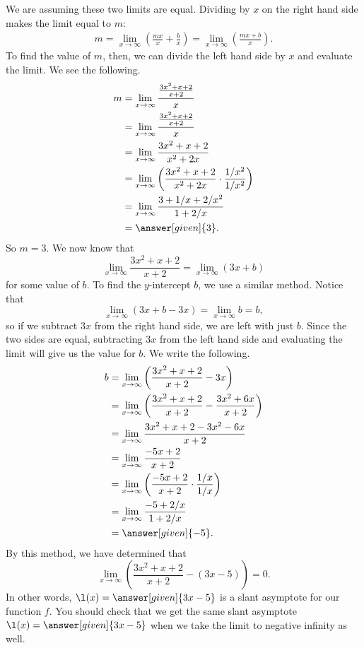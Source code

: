 \documentclass{ximera}
\begin{document}
\begin{example}
\begin{explanation}
    We are assuming these two limits are equal.  Dividing by $x$ on the right hand side makes the limit equal to $m$:
    \begin{align*}
    m = \lim_{x \to \infty} \left(\frac{mx}{x} + \frac{b}{x}\right) = \lim_{x \to \infty} \left(\frac{mx+b}{x}\right).
    \end{align*}
    To find the value of $m$, then, we can divide the left hand side by $x$ and evaluate the limit.   We see the following. 
    \begin{align*}
      m &=\lim_{x\to\infty}\frac{\frac{3x^2+x+2}{x+2}}{x}\\
      &= \lim_{x\to\infty}\frac{\frac{3x^2+x+2}{x+2}}{x}\\
      &= \lim_{x\to\infty}\frac{3x^2+x+2}{x^2+2x}\\
      &= \lim_{x\to\infty}\left(\frac{3x^2+x+2}{x^2+2x}\cdot\frac{1/x^2}{1/x^2}\right)\\
      &= \lim_{x\to\infty}\frac{3+1/x+2/x^2}{1+2/x}\\
      &= \answer[given]{3}.
    \end{align*}
    So $m=3$.  We now know that
    \[
    \lim_{x \to \infty}\frac{3x^2 +x+2}{x+2} = \lim_{x \to \infty} (3x + b)
    \]
    for some value of $b$.  To find the $y$-intercept $b$, we use a similar method.  Notice that
    \[
    \lim_{x \to \infty}( 3x + b - 3x )= \lim_{x \to \infty} b = b,
    \]
    so if we subtract $3x$ from the right hand side, we are left with just $b$.  Since the two sides are equal, subtracting $3x$ from the left hand side and evaluating the limit will give us the value for $b$.  We write the following.
    \begin{align*}
      b &=\lim_{x\to\infty} \left(\frac{3x^2+x+2}{x+2} - 3x\right)\\
      &=\lim_{x\to\infty} \left( \frac{3x^2+x+2}{x+2} - \frac{3x^2 + 6x}{x+2}\right) \\
      &=\lim_{x\to\infty} \frac{3x^2+x+2-3x^2-6x}{x+2}\\
      &=\lim_{x\to\infty}  \frac{-5x+2}{x+2}\\
      &=\lim_{x\to\infty} \left(\frac{-5x+2}{x+2}\cdot\frac{1/x}{1/x}\right)\\
      &=\lim_{x\to\infty} \frac{-5+2/x}{1+2/x}\\
      &= \answer[given]{-5}.
    \end{align*}
    By this method, we have determined that 
    \[
    \lim_{x\to\infty}\left(\frac{3x^2+x+2}{x+2} - (3x-5) \right) = 0.
    \]
   In other words, $\l(x) = \answer[given]{3x-5}$ is a slant asymptote
   for our function $f$.  You should check that we get the same slant
   asymptote $\l(x) = \answer[given]{3x-5}$ when we take the limit to
   negative infinity as well.
  \end{explanation}
\end{example}
\end{document}
